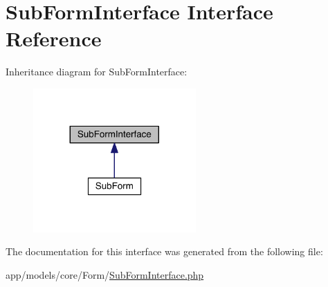 \hypertarget{interfaceapp_1_1models_1_1core_1_1_form_1_1_sub_form_interface}{\section{Sub\-Form\-Interface Interface Reference}
\label{interfaceapp_1_1models_1_1core_1_1_form_1_1_sub_form_interface}
}


Inheritance diagram for Sub\-Form\-Interface\-:
\nopagebreak
\begin{figure}[H]
\begin{center}
\leavevmode
\includegraphics[width=176pt]{interfaceapp_1_1models_1_1core_1_1_form_1_1_sub_form_interface__inherit__graph}
\end{center}
\end{figure}


The documentation for this interface was generated from the following file\-:\begin{DoxyCompactItemize}
\item 
app/models/core/\-Form/\hyperlink{_sub_form_interface_8php}{Sub\-Form\-Interface.\-php}\end{DoxyCompactItemize}
